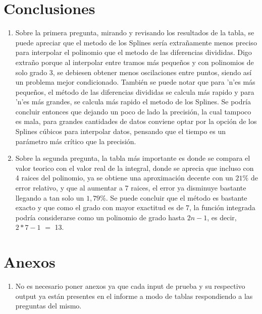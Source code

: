 \documentclass[letter, 10pt]{article}
\begin{document}
\section{Conclusiones}
\begin{enumerate}
\item Sobre la primera pregunta, mirando y revisando los resultados de la tabla, se puede apreciar que el metodo de los Splines ser\'ia extra\~namente menos preciso para interpolar el polinomio que el metodo de las diferencias divididas. Digo extra\~no porque al interpolar entre tramos m\'as peque\~nos y con polinomios de solo grado 3, se debiesen obtener menos oscilaciones entre puntos, siendo as\'i un problema mejor condicionado. Tambi\'en se puede notar que para 'n'es m\'as peque\~nos, el m\'etodo de las diferencias divididas se calcula m\'as rapido y para 'n'es m\'as grandes, se calcula m\'as rapido el metodo de los Splines. Se podr\'ia concluir entonces que dejando un poco de lado la precisi\'on, la cual tampoco es mala, para grandes cantidades de datos conviene optar por la opci\'on de los Splines c\'ubicos para interpolar datos, pensando que el tiempo es un par\'ametro m\'as cr\'itico que la precisi\'on.\\

\item Sobre la segunda pregunta, la tabla m\'as importante es donde se compara el valor teorico con el valor real de la integral, donde se aprecia que incluso con 4 raices del polinomio, ya se obtiene una aproximaci\'on decente con un $21\%$ de error relativo, y que al aumentar a 7 raices, el error ya disminuye bastante llegando a tan solo un $1,79\%$. Se puede concluir que el m\'etodo es bastante exacto y que como el grado con mayor exactitud es de 7, la funci\'on integrada podr\'ia considerarse como un polinomio de grado hasta $2n-1$, es decir, $2*7-1$ $=$ 13.\\
\end{enumerate}

\section{Anexos}
\begin{enumerate}
\item No es necesario poner anexos ya que cada input de prueba y su respectivo output ya est\'an presentes en el informe a modo de tablas respondiendo a las preguntas del mismo.
\end{enumerate}
\end{document}
